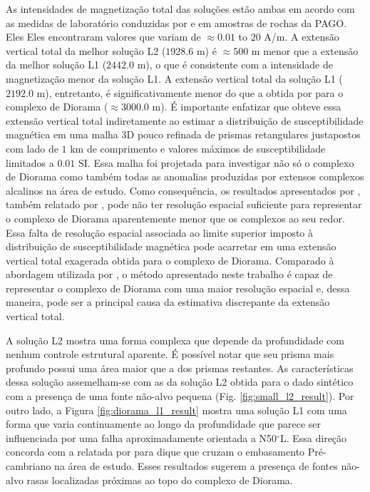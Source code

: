 As intensidades de magnetização total das soluções estão ambas em acordo com as medidas de laboratório conduzidas por \citet{dutra2011} e \citet{dutra_etal2014} 
em amostras de rochas da PAGO. Eles Eles encontraram valores que variam de $\approx 0.01$ to $20$ A/m.
A extensão vertical total da melhor solução L2 ($1928.6$ m) é $\approx 500$ m 
menor que a extensão da melhor solução L1 ($2442.0$ m), o que é consistente com a intensidade de magnetização menor da solução L1.
A extensão vertical total da solução L1 ($2192.0$ m), entretanto, é significativamente menor do que a obtida por \citet[][Fig. 4.9, p. 78]{dutra2011} para o complexo de Diorama ($\approx 3000.0$ m). 
É importante enfatizar que \cite{dutra2011} obteve essa extensão vertical total indiretamente ao estimar a distribuição de susceptibilidade magnética em uma malha 3D pouco refinada de prismas retangulares justapostos com lado de $1$ km de comprimento e valores máximos de susceptibilidade limitados a $0.01$ SI.
Essa malha foi projetada para investigar não só o complexo de Diorama como também todas as anomalias produzidas por extensos complexos alcalinos na área de estudo. Como consequência, os resultados apresentados por
\citet{dutra2011}, também relatado por \citet{marangoni_mantovani2013}, pode não ter resolução espacial suficiente para representar o complexo de Diorama aparentemente menor que os complexos ao seu redor.
Essa falta de resolução espacial associada ao limite superior imposto à distribuição de susceptibilidade magnética pode acarretar em uma extensão vertical total exagerada obtida para o complexo de Diorama.
Comparado à abordagem utilizada por \citet{dutra2011}, o método apresentado neste trabalho é capaz de representar o complexo de Diorama com uma maior resolução espacial e, dessa maneira, pode ser a principal causa da estimativa discrepante da extensão vertical total.

A solução L2 mostra uma forma complexa que depende da profundidade com nenhum controle estrutural aparente. É possível notar que seu prisma mais profundo possui uma área maior que a dos prismas restantes. As características dessa solução assemelham-se com as da solução L2 obtida para o dado sintético com a presença de uma fonte não-alvo pequena (Fig. \ref{fig:small_l2_result}).
Por outro lado, a Figura \ref{fig:diorama_l1_result} mostra uma solução L1 com uma forma que varia continuamente ao longo da profundidade que parece ser influenciada por uma falha aproximadamente orientada a N50$ ^\circ $L. Essa direção concorda com a relatada por
\citet{junqueirabrod_etal2002} para dique que cruzam o embasamento Pré-cambriano na área de estudo.
Esses resultados sugerem a presença de fontes não-alvo rasas localizadas próximas ao topo do complexo de Diorama.


